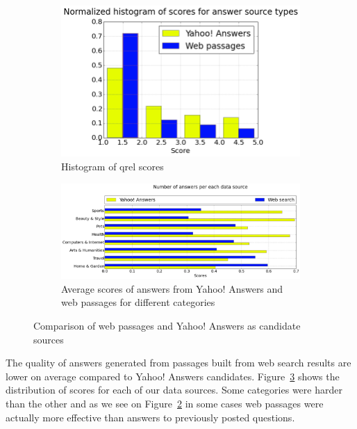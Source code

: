 \begin{figure}
	\centering
	\begin{subfigure}[b]{0.38\textwidth}
		\includegraphics[width=\textwidth]{img/liveqa_answer_source_scores}
		\caption{Histogram of qrel scores}
		\label{figure:non-factoid:liveqa:answer_source:scores}
	\end{subfigure}
	\begin{subfigure}[b]{0.6\textwidth}
		\includegraphics[width=\textwidth]{img/liveqa_answer_source_by_category}
		\caption{Average scores of answers from Yahoo! Answers and web passages for different categories}
		\label{figure:non-factoid:liveqa:answer_source:category}
	\end{subfigure}
	\caption{Comparison of web passages and Yahoo! Answers as candidate sources}
	\label{figure:non-factoid:liveqa:answer_source}
\end{figure}

The quality of answers generated from passages built from web search results are lower on average compared to Yahoo! Answers candidates.
Figure~\ref{figure:non-factoid:liveqa:answer_source} shows the distribution of scores for each of our data sources.
Some categories were harder than the other \cite{Agichtein15:liveqa} and as we see on Figure~\ref{figure:non-factoid:liveqa:answer_source:category} in some cases web passages were actually more effective than answers to previously posted questions.

